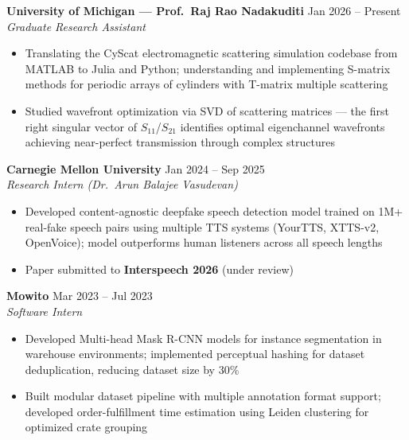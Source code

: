 \documentclass[9pt]{article}
\begin{document}
\vspace{-1mm}
\textbf{University of Michigan --- Prof.\ Raj Rao Nadakuditi} \hfill Jan 2026 -- Present\\
\emph{Graduate Research Assistant}
\vspace{-6mm}
\begin{itemize}[leftmargin=*,noitemsep,topsep=1pt]
  \item Translating the CyScat electromagnetic scattering simulation codebase from MATLAB to Julia and Python; understanding and implementing S-matrix methods for periodic arrays of cylinders with T-matrix multiple scattering
  \item Studied wavefront optimization via SVD of scattering matrices --- the first right singular vector of $S_{11}$/$S_{21}$ identifies optimal eigenchannel wavefronts achieving near-perfect transmission through complex structures
\end{itemize}

\vspace{-1mm}
\textbf{Carnegie Mellon University} \hfill Jan 2024 -- Sep 2025\\
\emph{Research Intern (Dr.\ Arun Balajee Vasudevan)}
\vspace{-6mm}
\begin{itemize}[leftmargin=*,noitemsep,topsep=1pt]
  \item Developed content-agnostic deepfake speech detection model trained on 1M+ real-fake speech pairs using multiple TTS systems (YourTTS, XTTS-v2, OpenVoice); model outperforms human listeners across all speech lengths
  \item Paper submitted to \textbf{Interspeech 2026} (under review)
\end{itemize}

\vspace{-1mm}
\textbf{Mowito} \hfill Mar 2023 -- Jul 2023\\
\emph{Software Intern}
\vspace{-6mm}
\begin{itemize}[leftmargin=*,noitemsep,topsep=1pt]
  \item Developed Multi-head Mask R-CNN models for instance segmentation in warehouse environments; implemented perceptual hashing for dataset deduplication, reducing dataset size by 30\%
  \item Built modular dataset pipeline with multiple annotation format support; developed order-fulfillment time estimation using Leiden clustering for optimized crate grouping
\end{itemize}
\end{document}
